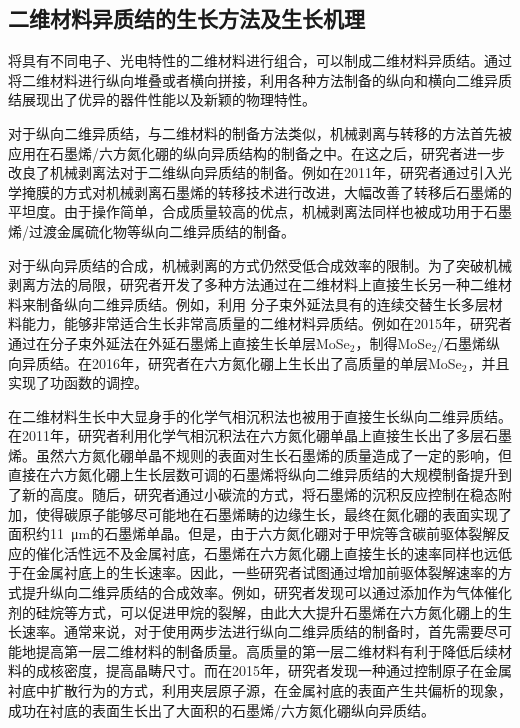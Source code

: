 
\subsection{二维材料异质结的生长方法及生长机理}
    将具有不同电子、光电特性的二维材料进行组合，可以制成二维材料异质结。通过将二维材料进行纵向堆叠或者横向拼接，利用各种方法制备的纵向和横向二维异质结展现出了优异的器件性能以及新颖的物理特性。

    对于纵向二维异质结，与二维材料的制备方法类似，机械剥离与转移的方法首先被应用在石墨烯/六方氮化硼的纵向异质结构的制备之中。在这之后，研究者进一步改良了机械剥离法对于二维纵向异质结的制备。例如在2011年，研究者通过引入光学掩膜的方式对机械剥离石墨烯的转移技术进行改进，大幅改善了转移后石墨烯的平坦度。由于操作简单，合成质量较高的优点，机械剥离法同样也被成功用于石墨烯/过渡金属硫化物等纵向二维异质结的制备。

    对于纵向异质结的合成，机械剥离的方式仍然受低合成效率的限制。为了突破机械剥离方法的局限，研究者开发了多种方法通过在二维材料上直接生长另一种二维材料来制备纵向二维异质结。例如，利用
    分子束外延法具有的连续交替生长多层材料能力，能够非常适合生长非常高质量的二维材料异质结。例如在2015年，研究者通过在分子束外延法在外延石墨烯上直接生长单层MoSe$_2$，制得MoSe$_2$/石墨烯纵向异质结。在2016年，研究者在六方氮化硼上生长出了高质量的单层MoSe$_2$，并且实现了功函数的调控。

    在二维材料生长中大显身手的化学气相沉积法也被用于直接生长纵向二维异质结。在2011年，研究者利用化学气相沉积法在六方氮化硼单晶上直接生长出了多层石墨烯。虽然六方氮化硼单晶不规则的表面对生长石墨烯的质量造成了一定的影响，但直接在六方氮化硼上生长层数可调的石墨烯将纵向二维异质结的大规模制备提升到了新的高度。随后，研究者通过小碳流的方式，将石墨烯的沉积反应控制在稳态附加，使得碳原子能够尽可能地在石墨烯畴的边缘生长，最终在氮化硼的表面实现了面积约\SI{11}{\micro\metre}的石墨烯单晶。但是，由于六方氮化硼对于甲烷等含碳前驱体裂解反应的催化活性远不及金属衬底，石墨烯在六方氮化硼上直接生长的速率同样也远低于在金属衬底上的生长速率。因此，一些研究者试图通过增加前驱体裂解速率的方式提升纵向二维异质结的合成效率。例如，研究者发现可以通过添加作为气体催化剂的硅烷等方式，可以促进甲烷的裂解，由此大大提升石墨烯在六方氮化硼上的生长速率。通常来说，对于使用两步法进行纵向二维异质结的制备时，首先需要尽可能地提高第一层二维材料的制备质量。高质量的第一层二维材料有利于降低后续材料的成核密度，提高晶畴尺寸。而在2015年，研究者发现一种通过控制原子在金属衬底中扩散行为的方式，利用夹层原子源，在金属衬底的表面产生共偏析的现象，成功在衬底的表面生长出了大面积的石墨烯/六方氮化硼纵向异质结。
    
